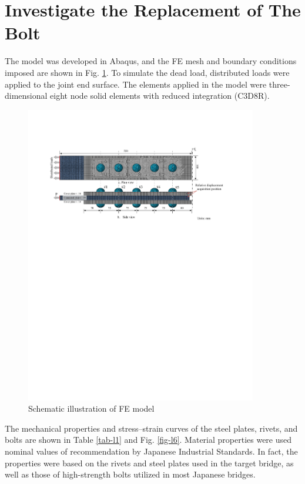 \section{Investigate the Replacement of The Bolt}

The model was developed in Abaqus, and the FE mesh and boundary conditions imposed are shown in Fig. \ref{fig-l5}. To simulate the dead load, distributed loads were applied to the joint end surface. The elements applied in the model were three-dimensional eight node solid elements with reduced integration (C3D8R).

\begin{figure}[htbp]
    \centering
    \includegraphics[width=0.9\textwidth]{imgs/ch4/fig-l5.pdf}
    \caption{Schematic illustration of FE model}
    \label{fig-l5}
\end{figure}

The mechanical properties and stress–strain curves of the steel plates, rivets, and bolts are shown in Table \ref{tab-l1} and Fig. \ref{fig-l6}. Material properties were used nominal values of recommendation by Japanese Industrial Standards. In fact, the properties were based on the rivets and steel plates used in the target bridge, as well as those of high-strength bolts utilized in most Japanese bridges.


